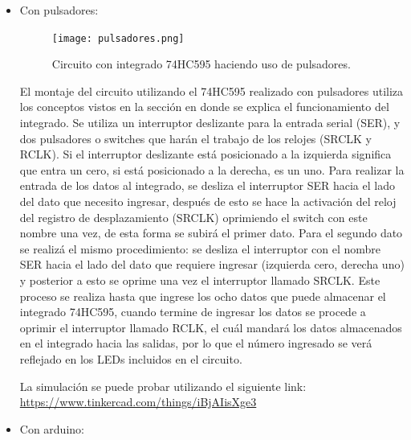 \documentclass{article}
\begin{document}
\begin{itemize}
\item Con pulsadores: 

\begin{figure}[h]
\texttt{[image: pulsadores.png]}
\centering
\caption{Circuito con integrado 74HC595 haciendo uso de pulsadores.}
\label{fig:pulsadores}
\end{figure}

El montaje del circuito utilizando el 74HC595 realizado con pulsadores utiliza los conceptos vistos en la sección en donde se explica el funcionamiento del integrado. 
Se utiliza un interruptor deslizante para la entrada serial (SER), y dos pulsadores o switches que harán el trabajo de los relojes (SRCLK y RCLK). Si el interruptor deslizante está posicionado a la izquierda significa que entra un cero, si está posicionado a la derecha, es un uno. 
Para realizar la entrada de los datos al integrado, se desliza el interruptor SER hacia el lado del dato que necesito ingresar, después de esto se hace la activación del reloj del registro de desplazamiento (SRCLK) oprimiendo el switch con este nombre una vez, de esta forma se subirá el primer dato. Para el segundo dato se realizá el mismo procedimiento: se desliza el interruptor con el nombre SER hacia el lado del dato que requiere ingresar (izquierda cero, derecha uno) y posterior a esto se oprime una vez el interruptor llamado SRCLK. Este proceso se realiza hasta que ingrese los ocho datos que puede almacenar el integrado 74HC595, cuando termine de ingresar los datos se procede a oprimir el interruptor llamado RCLK, el cuál mandará los datos almacenados en el integrado hacia las salidas, por lo que el número ingresado se verá reflejado en los LEDs incluidos en el circuito.

La simulación se puede probar utilizando el siguiente link: \url{https://www.tinkercad.com/things/iBjAIisXge3}

\item Con arduino: 


\end{itemize}
\end{document}
